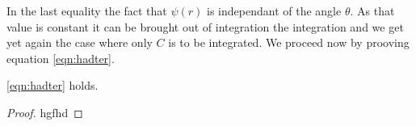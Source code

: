 \documentclass[../main.tex]{subfiles}
\begin{document}
		In the last equality the fact that $ \psi(r) $ is independant of the angle $ \theta $. As that value is constant it can be brought out of integration the integration and we get yet again the case where only $ C $ is to be integrated.
		We proceed now by prooving equation \ref{eqn:hadter}. 
		\begin{thm}
			\ref{eqn:hadter} holds.
		\end{thm}
		\begin{proof}
			hgfhd
		\end{proof}
\end{document}

